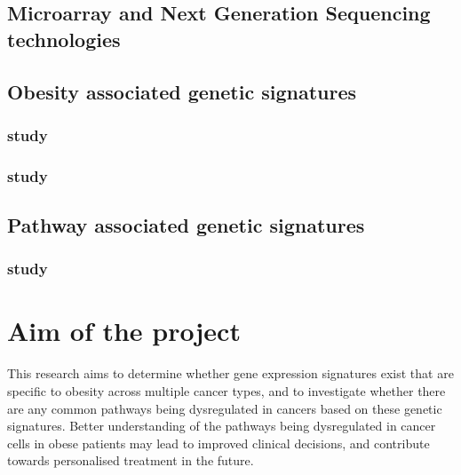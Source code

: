 \subsection{Microarray and Next Generation Sequencing technologies}
\label{sub:microarray_and_next_generation_sequencing_technologies}


\subsection{Obesity associated genetic signatures}
\label{sub:obesity_associated_genetic_signatures}

\subsubsection{\citet{Creighton2012} study}
\label{ssub:creighton_study}



\subsubsection{\citet{Fuentes-Mattei2014} study}
\label{ssub:fuentes_mattei_study}




\subsection{Pathway associated genetic signatures}
\label{sub:pathway_associated_genetic_signatures}


\subsubsection{\citet{Gatza2011} study}
\label{ssub:gatza_study}





\section{Aim of the project}
\label{sec:aim}

This research aims to determine whether gene expression signatures exist  that are specific to obesity across multiple cancer types, and to investigate whether there are any common pathways being dysregulated in cancers based on these genetic signatures.
Better understanding of the pathways being dysregulated in cancer cells in obese patients may lead to improved clinical decisions, and contribute towards personalised treatment in the future.

